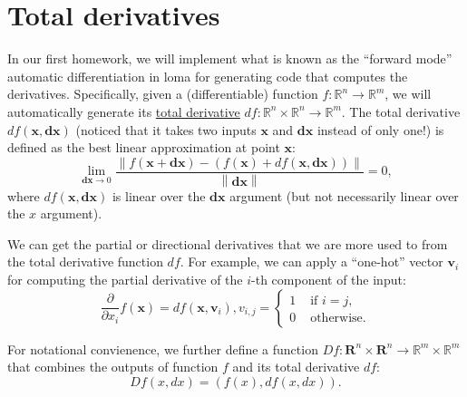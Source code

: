 




\section{Total derivatives}

In our first homework, we will implement what is known as the ``forward mode'' automatic differentiation in loma for generating code that computes the derivatives.
Specifically, given a (differentiable) function $f: \mathbb{R}^n \rightarrow \mathbb{R}^m$, we will automatically generate its \href{https://en.wikipedia.org/wiki/Total_derivative}{total derivative} $df: \mathbb{R}^n \times \mathbb{R}^n \rightarrow \mathbb{R}^m$. 
The total derivative $df(\mathbf{x}, \mathbf{dx})$ (noticed that it takes two inputs $\mathbf{x}$ and $\mathbf{dx}$ instead of only one!) is defined as the best linear approximation at point $\mathbf{x}$:
\begin{equation}
\lim_{\mathbf{dx} \rightarrow 0} \frac{\left\|f(\mathbf{x} + \mathbf{dx}) - \left(f(\mathbf{x}) + df(\mathbf{x}, \mathbf{dx})\right)\right\|}{\left\|\mathbf{dx}\right\|} = 0,
\label{eq:totalderiv}
\end{equation}
where $df(\mathbf{x}, \mathbf{dx})$ is linear over the $\mathbf{dx}$ argument (but not necessarily linear over the $x$ argument).

We can get the partial or directional derivatives that we are more used to from the total derivative function $df$. For example, we can apply a ``one-hot'' vector $\mathbf{v}_i$ for computing the partial derivative of the $i$-th component of the input:
\begin{equation}
\frac{\partial}{\partial x_i} f(\mathbf{x}) = df(\mathbf{x}, \mathbf{v}_i), v_{i,j} = \begin{cases}
1 & \text{ if } i = j, \\
0 & \text{ otherwise}.
\end{cases}
\end{equation}

For notational convienence, we further define a function $Df: \mathbf{R}^n \times \mathbf{R}^n \rightarrow \mathbb{R}^m \times \mathbb{R}^m$ that combines the outputs of function $f$ and its total derivative $df$:
\begin{equation}
Df(x, dx) = \left(f(x), df(x, dx)\right).
\end{equation}

